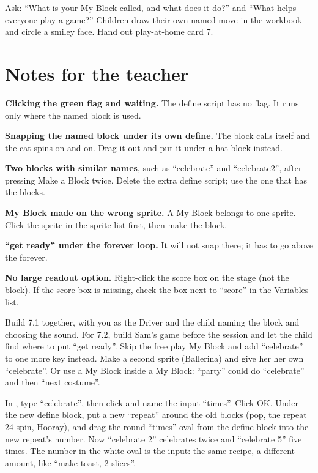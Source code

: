 \begin{reflection}
Ask: \enquote{What is your My Block called, and what does it do?} and \enquote{What helps everyone play a game?} Children draw their own named move in the workbook and circle a smiley face. Hand out play-at-home card 7.
\end{reflection}

\section{Notes for the teacher}
\begin{commonmistakes}
  \item \textbf{Clicking the green flag and waiting.} The define script has no flag. It runs only where the named block is used.
  \item \textbf{Snapping the named block under its own define.} The block calls itself and the cat spins on and on. Drag it out and put it under a hat block instead.
  \item \textbf{Two blocks with similar names}, such as \enquote{celebrate} and \enquote{celebrate2}, after pressing Make a Block twice. Delete the extra define script; use the one that has the blocks.
  \item \textbf{My Block made on the wrong sprite.} A My Block belongs to one sprite. Click the sprite in the sprite list first, then make the block.
  \item \textbf{\enquote{get ready} under the forever loop.} It will not snap there; it has to go above the forever.
  \item \textbf{No large readout option.} Right-click the score box on the stage (not the block). If the score box is missing, check the box next to \enquote{score} in the Variables list.
\end{commonmistakes}

\begin{differentiation}
\supportpath Build 7.1 together, with you as the Driver and the child naming the block and choosing the sound. For 7.2, build Sam's game before the session and let the child find where to put \enquote{get ready}. Skip the free play My Block and add \enquote{celebrate} to one more key instead.
\extensionpath Make a second sprite (Ballerina) and give her her own \enquote{celebrate}. Or use a My Block inside a My Block: \enquote{party} could do \enquote{celebrate} and then \enquote{next costume}.
\end{differentiation}

\begin{stretchchallenge}
In , type \enquote{celebrate}, then click  and name the input \enquote{times}. Click OK. Under the new define block, put a new \enquote{repeat} around the old blocks (pop, the repeat 24 spin, Hooray), and drag the round \enquote{times} oval from the define block into the new repeat's number. Now \enquote{celebrate 2} celebrates twice and \enquote{celebrate 5} five times. The number in the white oval is the input: the same recipe, a different amount, like \enquote{make toast, 2 slices}.
\end{stretchchallenge}

